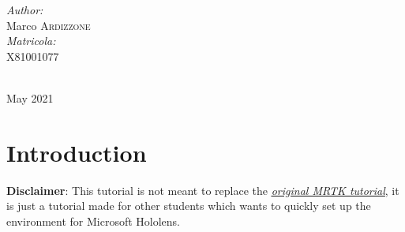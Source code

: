 \documentclass[12pt]{article}
\begin{document}
\begin{titlepage}

\begin{minipage}{0.4\textwidth}
\begin{flushleft} \large
\emph{Author:}\\
Marco \textsc{Ardizzone}\\ %

\vspace{0.3cm}
\emph{Matricola:}\\
X81001077\\ %
\end{flushleft}

\end{minipage}\\[2cm]



{\large May 2021}\\[2cm] %

\vfill %

\end{titlepage}



\tableofcontents
\clearpage
\section{Introduction}
\textbf{Disclaimer}: This tutorial is not meant to replace the \href{https://docs.microsoft.com/en-us/windows/mixed-reality/develop/unity/tutorials/mr-learning-base-01}{\underline{\emph{original MRTK tutorial}}}, it is just a tutorial made for other students which wants to quickly set up the environment for Microsoft Hololens. 
 
\end{document}

